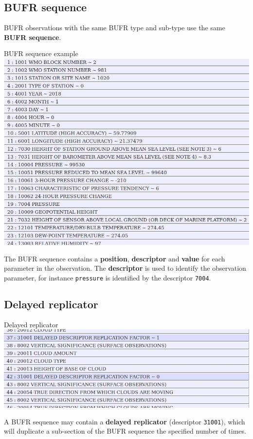 \documentclass[letterpaper,10pt,twoside,twocolumn,openany]{book}
\begin{document}
{\subsection{BUFR sequence}
BUFR observations with the same BUFR type and sub-type use the same {\bf BUFR sequence}.
\begin{paperbox}{BUFR sequence example}
  \includegraphics[width=\columnwidth]{bufr1.jpg}
\end{paperbox}
The BUFR sequence contains a {\bf position}, {\bf descriptor} and {\bf value}
for each parameter in the observation.
The {\bf descriptor} is used to identify the observation parameter, for instance 
\lstinline!pressure! is identified by the descriptor \lstinline!7004!.
\hypertarget{delayed}{}
\subsection{Delayed replicator}
\begin{paperbox}{Delayed replicator}
  \includegraphics[width=\columnwidth]{bufr2.jpg}
\end{paperbox}

A BUFR sequence may contain a {\bf delayed replicator} (descriptor \lstinline!31001!), 
which will duplicate a sub-section of the BUFR sequence the specified number of times. 

}
\end{document}
